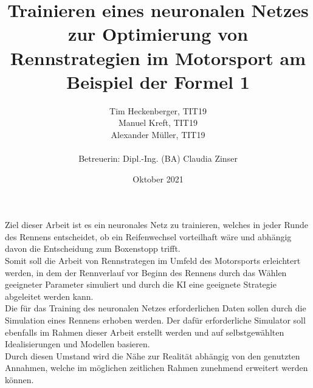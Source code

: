 \documentclass[12pt]{extarticle}
\title{Trainieren eines neuronalen Netzes zur Optimierung von Rennstrategien im Motorsport am Beispiel der Formel 1}
\author{Tim Heckenberger, TIT19 \\ Manuel Kreft, TIT19 \\ Alexander Müller, TIT19 \\\\ Betreuerin: Dipl.-Ing. (BA) Claudia Zinser}
\date{Oktober 2021}
\begin{document}
\setlength\parindent{0pt}

\maketitle
Ziel dieser Arbeit ist es ein neuronales Netz zu trainieren, welches in jeder Runde des Rennens entscheidet, ob ein Reifenwechsel vorteilhaft wäre und abhängig davon
die Entscheidung zum Boxenstopp trifft.\\
Somit soll die Arbeit von Rennstrategen im Umfeld des Motorsports erleichtert werden, in dem der Rennverlauf vor Beginn des Rennens durch das Wählen geeigneter Parameter simuliert und
durch die KI eine geeignete Strategie abgeleitet werden kann.\\
Die für das Training des neuronalen Netzes erforderlichen Daten sollen durch die Simulation eines Rennens erhoben werden. Der dafür erforderliche Simulator soll ebenfalls
im Rahmen dieser Arbeit erstellt werden und auf selbstgewählten Idealisierungen und Modellen basieren.\\
Durch diesen Umstand wird die Nähe zur Realität abhängig von den genutzten Annahmen, welche im möglichen zeitlichen Rahmen zunehmend erweitert werden können.
\end{document}
